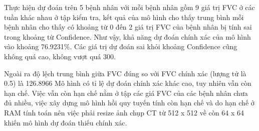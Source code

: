Thực hiện dự đoán trên 5 bệnh nhân với mỗi bệnh nhân gồm 9 giá trị FVC ở các tuần khác nhau ở tập kiểm tra, kết quả của mô hình cho thấy trung bình mỗi bệnh nhân cho thấy có khoảng từ 0 đến 2 giá trị FVC của bệnh nhân bị tính sai trong khoảng từ Confidence. Như vậy, khả năng dự đoán chính xác của mô hình vào khoảng 76.9231$\%$. Các giá trị dự đoán sai khỏi khoảng Confidence cũng không quá cao, không vượt quá 300.\par
Ngoài ra độ lệch trung bình giữa FVC đúng so với FVC chính xác (lượng tử là 0.5) là 126.8966 
Mô hình có tỉ lệ dự đoán chính xác khác cao, tuy nhiên vẫn còn hạn chế. Việc vẫn còn hạn chế nằm ở tập các giá FVC của các bệnh nhân chưa đủ nhiều, việc xây dựng mô hình hồi quy tuyến tính còn hạn chế và do hạn chế ở RAM tính toán nên việc phải resize ảnh chụp CT từ 512 x 512 về còn 64 x 64 khiến mô hình dự đoán thiếu chính xác.
